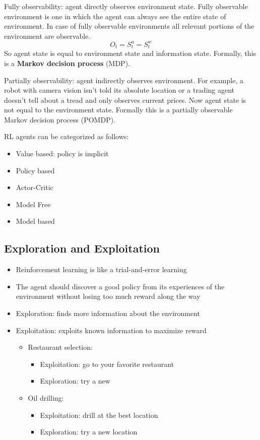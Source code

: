 Fully observability: agent directly observes environment state. Fully observable environment is one in which the agent can always see the entire state of environment. In case of fully observable environments all relevant portions of the environment are observable.
$$O_t=S_t^a=S_t^w$$
So agent state is equal to environment state and information state. Formally, this is a \textbf{Markov decision process} (MDP).

Partially observability: agent indirectly observes environment. For example, a robot with camera vision isn't told its absolute location or a trading agent doesn't tell about a tread and only observes current prices. Now agent state is not equal to the environment state. Formally this is a partially observable Markov decision process (POMDP). 

RL agents can be categorized as follows:
\begin{itemize}
	\item Value based: policy is implicit
	\item Policy based
	\item Actor-Critic
	\item Model Free
	\item Model based
\end{itemize}

\subsection{Exploration and Exploitation}
\begin{itemize}
	\item Reinforcement learning is like a trial-and-error learning
	\item The agent should discover a good policy from its experiences of the environment without losing too much reward along the way
	\item Exploration: finds more information about the environment
	\item Exploitation: exploits known information to maximize reward
	\begin{itemize}
		\item Restaurant selection: 
			\begin{itemize}
				\item Exploitation: go to your favorite restaurant 
				\item Exploration: try a new
			\end{itemize}
		\item Oil drilling: 
			\begin{itemize}
				\item Exploitation: drill at the best location 
				\item Exploration: try a new location
			\end{itemize}
			
	\end{itemize}
\end{itemize}


